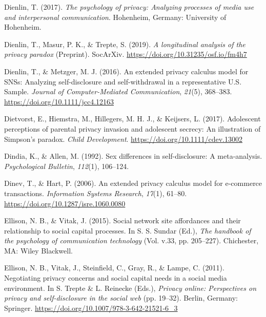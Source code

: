 \documentclass[
  english,
  man,floatsintext]{apa6}
\begin{document}
\leavevmode\hypertarget{ref-dienlinPsychologyPrivacyAnalyzing2017}{}%
Dienlin, T. (2017). \emph{The psychology of privacy: Analyzing processes of media use and interpersonal communication}. Hohenheim, Germany: University of Hohenheim.

\leavevmode\hypertarget{ref-dienlinLongitudinalAnalysisPrivacy2019}{}%
Dienlin, T., Masur, P. K., \& Trepte, S. (2019). \emph{A longitudinal analysis of the privacy paradox} (Preprint). SocArXiv. \url{https://doi.org/10.31235/osf.io/fm4h7}

\leavevmode\hypertarget{ref-dienlinExtendedPrivacyCalculus2016}{}%
Dienlin, T., \& Metzger, M. J. (2016). An extended privacy calculus model for SNSs: Analyzing self-disclosure and self-withdrawal in a representative U.S. Sample. \emph{Journal of Computer-Mediated Communication}, \emph{21}(5), 368--383. \url{https://doi.org/10.1111/jcc4.12163}

\leavevmode\hypertarget{ref-dietvorstAdolescentPerceptionsParental2017}{}%
Dietvorst, E., Hiemstra, M., Hillegers, M. H. J., \& Keijsers, L. (2017). Adolescent perceptions of parental privacy invasion and adolescent secrecy: An illustration of Simpson's paradox. \emph{Child Development}. \url{https://doi.org/10.1111/cdev.13002}

\leavevmode\hypertarget{ref-dindiaSexDifferencesSelfdisclosure1992}{}%
Dindia, K., \& Allen, M. (1992). Sex differences in self-disclosure: A meta-analysis. \emph{Psychological Bulletin}, \emph{112}(1), 106--124.

\leavevmode\hypertarget{ref-dinevExtendedPrivacyCalculus2006}{}%
Dinev, T., \& Hart, P. (2006). An extended privacy calculus model for e-commerce transactions. \emph{Information Systems Research}, \emph{17}(1), 61--80. \url{https://doi.org/10.1287/isre.1060.0080}

\leavevmode\hypertarget{ref-ellisonSocialNetworkSite2015}{}%
Ellison, N. B., \& Vitak, J. (2015). Social network site affordances and their relationship to social capital processes. In S. S. Sundar (Ed.), \emph{The handbook of the psychology of communication technology} (Vol. v.33, pp. 205--227). Chichester, MA: Wiley Blackwell.

\leavevmode\hypertarget{ref-ellisonNegotiatingPrivacyConcerns2011}{}%
Ellison, N. B., Vitak, J., Steinfield, C., Gray, R., \& Lampe, C. (2011). Negotiating privacy concerns and social capital needs in a social media environment. In S. Trepte \& L. Reinecke (Eds.), \emph{Privacy online: Perspectives on privacy and self-disclosure in the social web} (pp. 19--32). Berlin, Germany: Springer. \url{https://doi.org/10.1007/978-3-642-21521-6_3}
\end{document}
